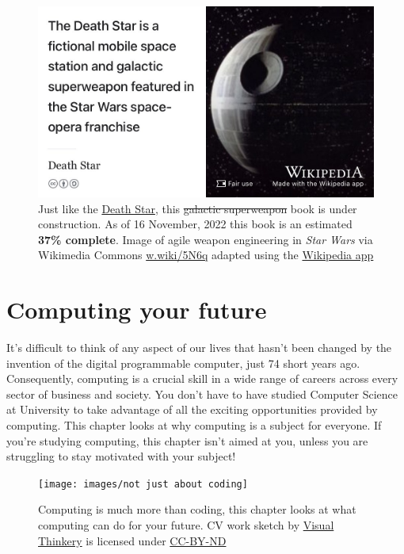 \documentclass[
]{book}
\begin{document}
\begin{figure}

{\centering \includegraphics[width=0.99\linewidth]{images/DeathStar2} 

}

\caption{Just like the \href{https://en.wikipedia.org/wiki/Death_Star}{Death Star}, this \sout{galactic superweapon} book is under construction. As of 16 November, 2022 this book is an estimated \textbf{37\% complete}. Image of agile weapon engineering in \emph{Star Wars} via Wikimedia Commons \href{https://w.wiki/5N6q}{w.wiki/5N6q} adapted using the \href{https://apps.apple.com/gb/app/wikipedia/id324715238}{Wikipedia app}}\label{fig:deathstar2-fig}
\end{figure}

\hypertarget{computing}{%
\chapter{Computing your future}\label{computing}}

It's difficult to think of any aspect of our lives that hasn't been changed by the invention of the digital programmable computer, just 74 short years ago. \citep{lavington} Consequently, computing is a crucial skill in a wide range of careers across every sector of business and society. You don't have to have studied Computer Science at University to take advantage of all the exciting opportunities provided by computing. This chapter looks at why computing is a subject for everyone. If you're studying computing, this chapter isn't aimed at you, unless you are struggling to stay motivated with your subject! 👨🏿‍💻👨‍💻👩🏽‍💻👩‍💻👨🏿‍💻

\begin{figure}

{\centering \texttt{[image: images/not just about coding]} 

}

\caption{Computing is much more than coding, this chapter looks at what computing can do for your future. CV work sketch by \href{https://visualthinkery.com}{Visual Thinkery} is licensed under \href{https://creativecommons.org/licenses/by-nd/4.0/}{CC-BY-ND}}\label{fig:not-coding-fig}
\end{figure}
\end{document}
